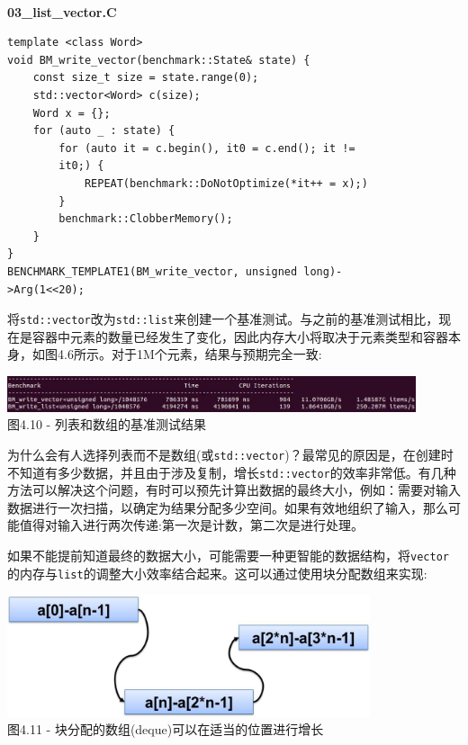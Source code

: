 \hspace*{\fill} \\ %
\noindent
\textbf{03\_list\_vector.C}
\begin{lstlisting}[style=styleCXX]
template <class Word>
void BM_write_vector(benchmark::State& state) {
	const size_t size = state.range(0);
	std::vector<Word> c(size);
	Word x = {};
	for (auto _ : state) {
		for (auto it = c.begin(), it0 = c.end(); it !=
		it0;) {
			REPEAT(benchmark::DoNotOptimize(*it++ = x);)
		}
		benchmark::ClobberMemory();
	}
}
BENCHMARK_TEMPLATE1(BM_write_vector, unsigned long)-
>Arg(1<<20);
\end{lstlisting}

将\texttt{std::vector}改为\texttt{std::list}来创建一个基准测试。与之前的基准测试相比，现在是容器中元素的数量已经发生了变化，因此内存大小将取决于元素类型和容器本身，如图4.6所示。对于1M个元素，结果与预期完全一致:

\begin{center}
\includegraphics[width=0.9\textwidth]{content/1/chapter4/images/10.jpg}\\
图4.10 - 列表和数组的基准测试结果
\end{center}

为什么会有人选择列表而不是数组(或\texttt{std::vector})？最常见的原因是，在创建时不知道有多少数据，并且由于涉及复制，增长\texttt{std::vector}的效率非常低。有几种方法可以解决这个问题，有时可以预先计算出数据的最终大小，例如：需要对输入数据进行一次扫描，以确定为结果分配多少空间。如果有效地组织了输入，那么可能值得对输入进行两次传递:第一次是计数，第二次是进行处理。

如果不能提前知道最终的数据大小，可能需要一种更智能的数据结构，将\texttt{vector}的内存与\texttt{list}的调整大小效率结合起来。这可以通过使用块分配数组来实现:

\begin{center}
\includegraphics[width=0.8\textwidth]{content/1/chapter4/images/11.jpg}\\
图4.11 - 块分配的数组(deque)可以在适当的位置进行增长
\end{center}

